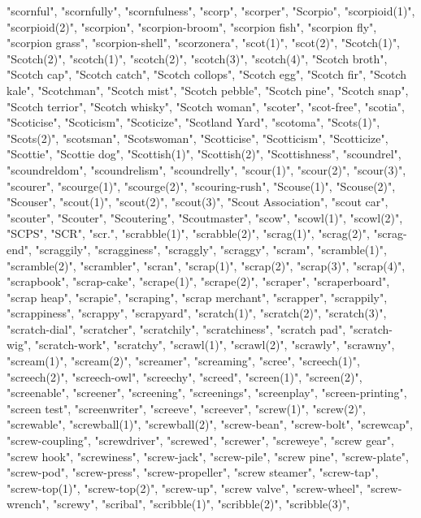 "scornful",
"scornfully",
"scornfulness",
"scorp",
"scorper",
"Scorpio",
"scorpioid(1)",
"scorpioid(2)",
"scorpion",
"scorpion-broom",
"scorpion fish",
"scorpion fly",
"scorpion grass",
"scorpion-shell",
"scorzonera",
"scot(1)",
"scot(2)",
"Scotch(1)",
"Scotch(2)",
"scotch(1)",
"scotch(2)",
"scotch(3)",
"scotch(4)",
"Scotch broth",
"Scotch cap",
"Scotch catch",
"Scotch collops",
"Scotch egg",
"Scotch fir",
"Scotch kale",
"Scotchman",
"Scotch mist",
"Scotch pebble",
"Scotch pine",
"Scotch snap",
"Scotch terrior",
"Scotch whisky",
"Scotch woman",
"scoter",
"scot-free",
"scotia",
"Scoticise",
"Scoticism",
"Scoticize",
"Scotland Yard",
"scotoma",
"Scots(1)",
"Scots(2)",
"scotsman",
"Scotswoman",
"Scotticise",
"Scotticism",
"Scotticize",
"Scottie",
"Scottie dog",
"Scottish(1)",
"Scottish(2)",
"Scottishness",
"scoundrel",
"scoundreldom",
"scoundrelism",
"scoundrelly",
"scour(1)",
"scour(2)",
"scour(3)",
"scourer",
"scourge(1)",
"scourge(2)",
"scouring-rush",
"Scouse(1)",
"Scouse(2)",
"Scouser",
"scout(1)",
"scout(2)",
"scout(3)",
"Scout Association",
"scout car",
"scouter",
"Scouter",
"Scoutering",
"Scoutmaster",
"scow",
"scowl(1)",
"scowl(2)",
"SCPS",
"SCR",
"scr.",
"scrabble(1)",
"scrabble(2)",
"scrag(1)",
"scrag(2)",
"scrag-end",
"scraggily",
"scragginess",
"scraggly",
"scraggy",
"scram",
"scramble(1)",
"scramble(2)",
"scrambler",
"scran",
"scrap(1)",
"scrap(2)",
"scrap(3)",
"scrap(4)",
"scrapbook",
"scrap-cake",
"scrape(1)",
"scrape(2)",
"scraper",
"scraperboard",
"scrap heap",
"scrapie",
"scraping",
"scrap merchant",
"scrapper",
"scrappily",
"scrappiness",
"scrappy",
"scrapyard",
"scratch(1)",
"scratch(2)",
"scratch(3)",
"scratch-dial",
"scratcher",
"scratchily",
"scratchiness",
"scratch pad",
"scratch-wig",
"scratch-work",
"scratchy",
"scrawl(1)",
"scrawl(2)",
"scrawly",
"scrawny",
"scream(1)",
"scream(2)",
"screamer",
"screaming",
"scree",
"screech(1)",
"screech(2)",
"screech-owl",
"screechy",
"screed",
"screen(1)",
"screen(2)",
"screenable",
"screener",
"screening",
"screenings",
"screenplay",
"screen-printing",
"screen test",
"screenwriter",
"screeve",
"screever",
"screw(1)",
"screw(2)",
"screwable",
"screwball(1)",
"screwball(2)",
"screw-bean",
"screw-bolt",
"screwcap",
"screw-coupling",
"screwdriver",
"screwed",
"screwer",
"screweye",
"screw gear",
"screw hook",
"screwiness",
"screw-jack",
"screw-pile",
"screw pine",
"screw-plate",
"screw-pod",
"screw-press",
"screw-propeller",
"screw steamer",
"screw-tap",
"screw-top(1)",
"screw-top(2)",
"screw-up",
"screw valve",
"screw-wheel",
"screw-wrench",
"screwy",
"scribal",
"scribble(1)",
"scribble(2)",
"scribble(3)",
